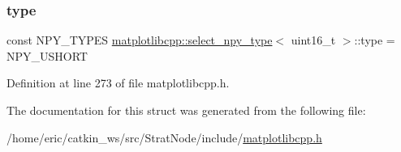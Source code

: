 \subsubsection{\texorpdfstring{type}{type}}
{\footnotesize\ttfamily const N\+P\+Y\+\_\+\+T\+Y\+P\+ES \mbox{\hyperlink{structmatplotlibcpp_1_1select__npy__type}{matplotlibcpp\+::select\+\_\+npy\+\_\+type}}$<$ uint16\+\_\+t $>$\+::type = N\+P\+Y\+\_\+\+U\+S\+H\+O\+RT\hspace{0.3cm}{\ttfamily [static]}}



Definition at line 273 of file matplotlibcpp.\+h.



The documentation for this struct was generated from the following file\+:\begin{DoxyCompactItemize}
\item 
/home/eric/catkin\+\_\+ws/src/\+Strat\+Node/include/\mbox{\hyperlink{matplotlibcpp_8h}{matplotlibcpp.\+h}}\end{DoxyCompactItemize}
